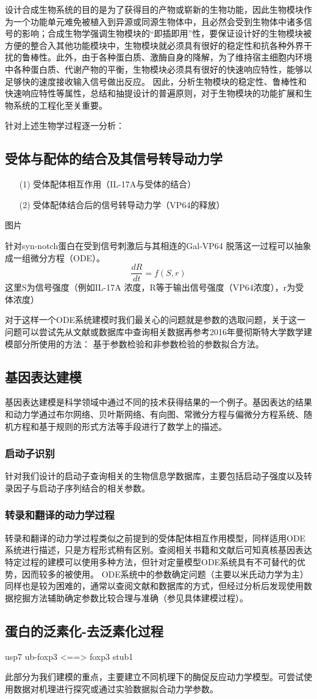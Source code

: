 \documentclass[UTF8]{ctexart}
\begin{document}
设计合成生物系统的目的是为了获得目的产物或崭新的生物功能，因此生物模块作为一个功能单元难免被植入到异源或同源生物体中，且必然会受到生物体中诸多信号的影响；合成生物学强调生物模块的“即插即用”性，要保证设计好的生物模块被方便的整合入其他功能模块中，生物模块就必须具有很好的稳定性和抗各种外界干扰的鲁棒性。此外，由于各种蛋白质、激酶自身的降解，为了维持宿主细胞内环境中各种蛋白质、代谢产物的平衡，生物模块必须具有很好的快速响应特性，能够以足够快的速度接收输入信号做出反应。
因此，分析生物模块的稳定性、鲁棒性和快速响应特性等属性，总结和抽提设计的普遍原则，对于生物模块的功能扩展和生物系统的工程化至关重要。

针对上述生物学过程逐一分析：
\subsection{受体与配体的结合及其信号转导动力学}
\begin{enumerate}
\item[(1)] 受体配体相互作用（IL-17A与受体的结合）
\item[(2)] 受体配体结合后的信号转导动力学（VP64的释放）
\end{enumerate}
\begin{tabbing}
	图片
\end{tabbing}

针对syn-notch蛋白在受到信号刺激后与其相连的Gal-VP64 脱落这一过程可以抽象成一组微分方程（ODE）。
$$\frac{dR}{dt} = f(S,r)$$   
这里S为信号强度（例如IL-17A 浓度，R等于输出信号强度（VP64浓度），r为受体浓度）

对于这样一个ODE系统建模时我们最关心的问题就是参数的选取问题，关于这一问题可以尝试先从文献或数据库中查询相关数据再参考2016年曼彻斯特大学数学建模部分所使用的方法：
基于参数检验和非参数检验的参数拟合方法。


\subsection{基因表达建模}
基因表达建模是科学领域中通过不同的技术获得结果的一个例子。基因表达的结果和动力学通过布尔网络、贝叶斯网络、有向图、常微分方程与偏微分方程系统、随机方程和基于规则的形式方法等手段进行了数学上的描述。
\subsubsection{启动子识别}
	针对我们设计的启动子查询相关的生物信息学数据库，主要包括启动子强度以及转录因子与启动子序列结合的相关参数。
\subsubsection{转录和翻译的动力学过程}
	转录和翻译的动力学过程类似之前提到的受体配体相互作用模型，同样适用ODE系统进行描述，只是方程形式稍有区别。查阅相关书籍和文献后可知真核基因表达特定过程的建模可以使用多种方法，但针对定量模型ODE系统具有不可替代的优势，因而较多的被使用。
	ODE系统中的参数确定问题（主要以米氏动力学为主）同样也是较为困难的，通常以查阅文献和数据库的方式，但经过分析后发现使用数据挖掘方法辅助确定参数比较合理与准确（参见具体建模过程）。
	

\subsection{蛋白的泛素化-去泛素化过程}

usp7
ub-foxp3 <==> foxp3
stub1


此部分为我们建模的重点，主要建立不同机理下的酶促反应动力学模型。可尝试使用数据对机理进行探究或通过实验数据拟合动力学参数。
\end{document}
